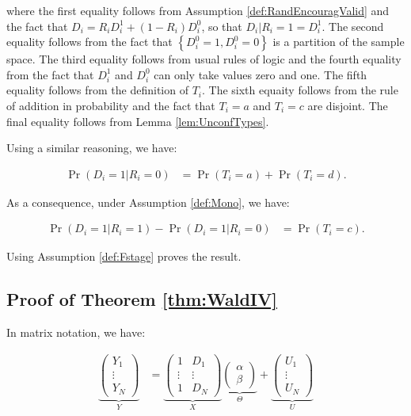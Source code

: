 \documentclass[]{book}
\theoremstyle{definition}
\theoremstyle{definition}
\theoremstyle{definition}
\theoremstyle{remark}
\begin{document}
where the first equality follows from Assumption
\ref{def:RandEncouragValid} and the fact that
\(D_i=R_iD_i^1+(1-R_i)D_i^0\), so that \(D_i|R_i=1=D_i^1\). The second
equality follows from the fact that \(\left\{ D_i^0=1,D_i^0=0\right\}\)
is a partition of the sample space. The third equality follows from
usual rules of logic and the fourth equality from the fact that
\(D_i^1\) and \(D_i^0\) can only take values zero and one. The fifth
equality follows from the definition of \(T_i\). The sixth equaity
follows from the rule of addition in probability and the fact that
\(T_i=a\) and \(T_i=c\) are disjoint. The final equality follows from
Lemma \ref{lem:UnconfTypes}.

Using a similar reasoning, we have:

\begin{align*}
\Pr(D_i=1|R_i=0) & = \Pr(T_i=a)+ \Pr(T_i=d).
\end{align*}

As a consequence, under Assumption \ref{def:Mono}, we have:

\begin{align*}
\Pr(D_i=1|R_i=1)-\Pr(D_i=1|R_i=0) & = \Pr(T_i=c).
\end{align*}

Using Assumption \ref{def:Fstage} proves the result.

\subsection{Proof of Theorem \ref{thm:WaldIV}}\label{proofWaldIV}

In matrix notation, we have:

\begin{align*}
  \underbrace{\left(\begin{array}{c}  Y_1 \\    \vdots \\   Y_N \end{array}\right)}_{Y} & =
  \underbrace{\left(\begin{array}{cc}   1 & D_1\\   \vdots & \vdots\\   1 & D_N\end{array}\right)}_{X}
  \underbrace{\left(\begin{array}{c}    \alpha \\   \beta \end{array}\right)}_{\Theta}+
  \underbrace{\left(\begin{array}{c}    U_1 \\  \vdots \\   U_N \end{array}\right)}_{U}
\end{align*}
\end{document}
